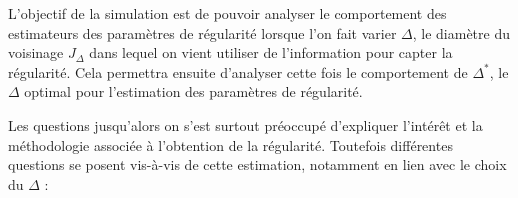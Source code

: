 L'objectif de la simulation est de pouvoir analyser le comportement des estimateurs des paramètres de régularité lorsque l'on fait varier $\Delta$, le diamètre du voisinage $J_\Delta$ dans lequel on vient utiliser de l'information pour capter la régularité. Cela permettra ensuite d'analyser cette fois le comportement de $\Delta^*$, le $\Delta$ optimal pour l'estimation des paramètres de régularité.

Les questions jusqu'alors on s'est surtout préoccupé d'expliquer l'intérêt et la méthodologie associée à l'obtention de la régularité. Toutefois différentes questions se posent vis-à-vis de cette estimation, notamment en lien avec le choix du $\Delta$ :

